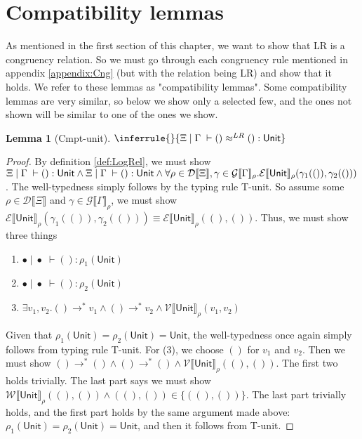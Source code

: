 \documentclass[twoside,11pt,openright]{report}
\newtheorem{lemma}[theorem]{Lemma}
\theoremstyle{definition}
\newcommand{\val}{v}
\newcommand{\TT}{()}
\newcommand{\Tunit}{\mathsf{Unit}}
\newcommand{\venv}{\Gamma}
\newcommand{\tenv}{\Xi}
\newcommand{\emptenv}{\bullet}
\newcommand{\empvenv}{\bullet}
\newcommand{\jdg}[4]{#1 \; | \; #2 \; \vdash #3 : #4}
\newcommand{\jdgRel}[6]{#1 \; | \; #2 \; \vdash #3 \approx^{#4} #5 : #6}
\newcommand{\stepS}{\rightarrow^*}
\newcommand{\WtInp}[2]{\mathcal{W} \llbracket #1 \rrbracket_{#2}}
\newcommand{\ValInp}[2]{\mathcal{V} \llbracket #1 \rrbracket_{#2}}
\newcommand{\ExpInp}[2]{\mathcal{E} \llbracket #1 \rrbracket_{#2}}
\newcommand{\VenvInp}[2]{\mathcal{G} \llbracket #1 \rrbracket_{#2}}
\newcommand{\TenvInp}[1]{\mathcal{D} \llbracket #1 \rrbracket}
\newcommand{\LogRel}[5]{\jdgRel{#1}{#2}{#3}{LR}{#4}{#5}}
\begin{document}
\section{Compatibility lemmas}
As mentioned in the first section of this chapter, we want to show that LR is a congruency relation. So we must go through each congruency rule mentioned in appendix \ref{appendix:Cng} (but with the relation being LR) and show that it holds. We refer to these lemmas as "compatibility lemmas". Some compatibility lemmas are very similar, so below we show only a selected few, and the ones not shown will be similar to one of the ones we show.
\begin{lemma}[Cmpt-unit]
  $\inferrule{ }{\LogRel{\tenv}{\venv}{\TT}{\TT}{\Tunit}}$
\end{lemma}
\begin{proof}
  By definition \ref*{def:LogRel}, we must show $\jdg{\tenv}{\venv}{\TT}{\Tunit} \land \jdg{\tenv}{\venv}{\TT}{\Tunit} \land\\ \forall \rho \in \TenvInp{\tenv}, \gamma \in \VenvInp{\venv}{\rho} . 
  \ExpInp{\Tunit}{\rho}(\gamma_1(\TT), \gamma_2(\TT))$. The well-typedness simply follows by the typing rule T-unit.
  So assume some $\rho \in \TenvInp{\tenv}$ and $\gamma \in \VenvInp{\venv}{\rho}$, we must show $\ExpInp{\Tunit}{\rho}(\gamma_1(\TT), \gamma_2(\TT)) \equiv \ExpInp{\Tunit}{\rho}(\TT, \TT)$. Thus, we must show three things
  \begin{enumerate}
    \item $\jdg{\emptenv}{\empvenv}{\TT}{\rho_1(\Tunit)}$
    \item $\jdg{\emptenv}{\empvenv}{\TT}{\rho_2(\Tunit)}$
    \item $\exists \val_1, \val_2 . \TT \stepS \val_1 \land \TT \stepS \val_2 \land \ValInp{\Tunit}{\rho}(\val_1, \val_2)$
  \end{enumerate}
  Given that $\rho_1(\Tunit) = \rho_2(\Tunit) = \Tunit$, the well-typedness once again simply follows from typing rule T-unit. For (3), we choose $\TT$ for $\val_1$ and $\val_2$. Then we must show $\TT \stepS \TT \land \TT \stepS \TT \land \ValInp{\Tunit}{\rho}(\TT, \TT)$. The first two holds trivially. The last part says we must show $\WtInp{\Tunit}{\rho}(\TT, \TT) \land (\TT, \TT) \in \{(\TT, \TT)\}$. The last part trivially holds, and the first part holds by the same argument made above: $\rho_1(\Tunit) = \rho_2(\Tunit) = \Tunit$, and then it follows from T-unit. 
\end{proof}
\end{document}
